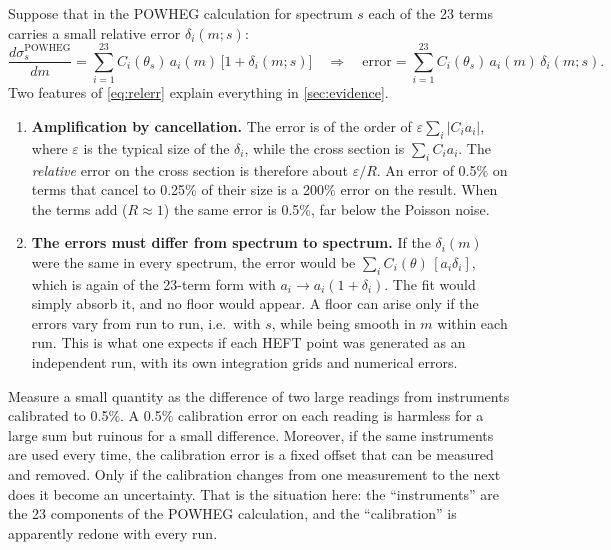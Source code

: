 \documentclass[11pt]{article}
\begin{document}
Suppose that in the POWHEG calculation for spectrum $s$ each of the 23 terms carries a small
relative error $\delta_{i}(m;s)$:
\begin{equation}
  \frac{d\sigma^{\text{POWHEG}}_s}{dm} = \sum_{i=1}^{23} C_i(\theta_s)\,a_i(m)\,\big[1 +
  \delta_i(m;s)\big]
  \quad\Longrightarrow\quad
  \text{error} = \sum_{i=1}^{23} C_i(\theta_s)\,a_i(m)\,\delta_i(m;s).
  \label{eq:relerr}
\end{equation}
Two features of \cref{eq:relerr} explain everything in \cref{sec:evidence}.

\begin{enumerate}
  \item \textbf{Amplification by cancellation.} The error is of the order of
    $\varepsilon\sum_i|C_ia_i|$, where $\varepsilon$ is the typical size of the
    $\delta_i$, while the cross section is $\sum_iC_ia_i$. The \emph{relative} error on the
    cross section is therefore about $\varepsilon/R$. An error of 0.5\% on terms that
    cancel to 0.25\% of their size is a 200\% error on the result. When the terms add
    ($R\approx1$) the same error is 0.5\%, far below the Poisson noise.
  \item \textbf{The errors must differ from spectrum to spectrum.} If the $\delta_i(m)$ were
    the same in every spectrum, the error would be
    $\sum_i C_i(\theta)\,[a_i\delta_i]$, which is again of the 23-term form with
    $a_i \to a_i(1+\delta_i)$. The fit would simply absorb it, and no floor would appear. A
    floor can arise only if the errors vary from run to run, i.e.\ with $s$, while being
    smooth in $m$ within each run. This is what one expects if each HEFT point was generated
    as an independent run, with its own integration grids and numerical errors.
\end{enumerate}

\begin{aside}
Measure a small quantity as the difference of two large readings from instruments calibrated
to 0.5\%. A 0.5\% calibration error on each reading is harmless for a large sum but ruinous
for a small difference. Moreover, if the same instruments are used every time, the
calibration error is a fixed offset that can be measured and removed. Only if the
calibration changes from one measurement to the next does it become an uncertainty. That is
the situation here: the ``instruments'' are the 23 components of the POWHEG calculation, and
the ``calibration'' is apparently redone with every run.
\end{aside}
\end{document}
